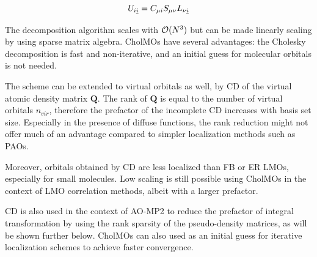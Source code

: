 \begin{equation}
U_{i\underline{i}} = C_{\mu i} S_{\mu \nu} L_{\nu \underline{i}}
\end{equation}

The decomposition algorithm scales with $\mathcal{O}(N^{3})$ but can be made linearly scaling by using sparse matrix algebra. CholMOs have several advantages: the Cholesky decomposition is fast and non-iterative, and an initial guess for molecular orbitals is not needed. 

The scheme can be extended to virtual orbitals as well, by CD of the virtual atomic density matrix $\mathbf{Q}$. The rank of $\mathbf{Q}$ is equal to the number of virtual orbitals $n_{vir}$, therefore the prefactor of the incomplete CD increases with basis set size. Especially in the presence of diffuse functions, the rank reduction might not offer much of an advantage compared to simpler localization methods such as PAOs.  

Moreover, orbitals obtained by CD are less localized than FB or ER LMOs, especially for small molecules. Low scaling is still possible using CholMOs in the context of LMO correlation methods, albeit with a larger prefactor.

CD is also used in the context of AO-MP2 to reduce the prefactor of integral transformation by using the rank sparsity of the pseudo-density matrices, as will be shown further below. CholMOs can also used as an initial guess for iterative localization schemes to achieve faster convergence.

